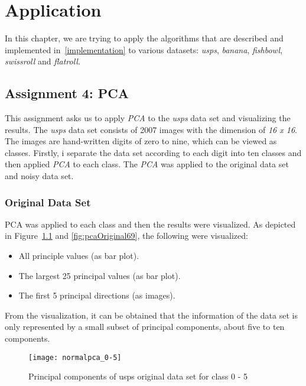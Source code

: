 \chapter{Application}
\label{application}

In this chapter, we are trying to apply the algorithms that are described and implemented in~\ref{implementation} to various datasets: \textit{usps}, \textit{banana}, \textit{fishbowl}, \textit{swissroll} and \textit{flatroll}.

\section{Assignment 4: PCA}
\label{assignment4}

This assignment asks us to apply \textit{PCA} to the \textit{usps} data set and visualizing the results. The \textit{usps} data set consists of 2007 images with the dimension of \textit{16 x 16}. The images are hand-written digits of zero to nine, which can be viewed as classes. Firstly, i separate the data set according to each digit into ten classes and then applied \textit{PCA} to each class. The \textit{PCA} was applied to the original data set and noisy data set.

\subsection{Original Data Set}
\label{ass4:original}

PCA was applied to each class and then the results were visualized. As depicted in Figure~\ref{fig:pcaOriginal05} and \ref{fig:pcaOriginal69}, the following were visualized:

\begin{itemize}
	\item All principle values (as bar plot).
	\item The largest 25 principal values (as bar plot).
	\item The first 5 principal directions (as images).
\end{itemize}

From the visualization, it can be obtained that the information of the data set is only represented by a small subset of principal components, about five to ten components. 

\begin{figure}[h!]
	\centering
	\texttt{[image: normalpca\_0-5]}
	\caption{Principal components of usps original data set for class 0 - 5}
	\label{fig:pcaOriginal05}
\end{figure}

